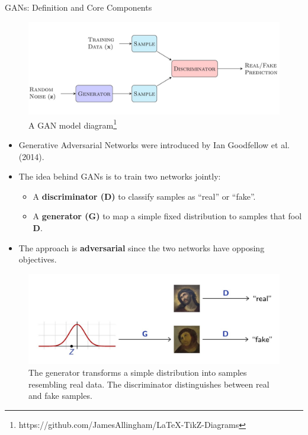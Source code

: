 \begin{frame}[allowframebreaks]{GANs: Definition and Core Components}
\begin{figure}
    \centering
    \includegraphics[height=0.7\textheight, width=\textwidth, keepaspectratio]{images/gan/gan_1.png}
    \caption*{A GAN model diagram\footnote{https://github.com/JamesAllingham/LaTeX-TikZ-Diagrams}}
\end{figure}

\framebreak

\begin{itemize}
    \item Generative Adversarial Networks were introduced by Ian Goodfellow et al. (2014).
    \item The idea behind GANs is to train two networks jointly:
    \begin{itemize}
        \item A \textbf{discriminator (D)} to classify samples as “real” or “fake”.
        \item A \textbf{generator (G)} to map a simple fixed distribution to samples that fool \textbf{D}.
    \end{itemize}
    \item The approach is \textbf{adversarial} since the two networks have opposing objectives.
\end{itemize}

\framebreak
\begin{figure}
    \centering
    \includegraphics[height=0.7\textheight, width=\textwidth, keepaspectratio]{images/gan/gan_2.png}
    \caption*{The generator transforms a simple distribution into samples resembling real data. The discriminator distinguishes between real and fake samples.}
\end{figure}
\end{frame}